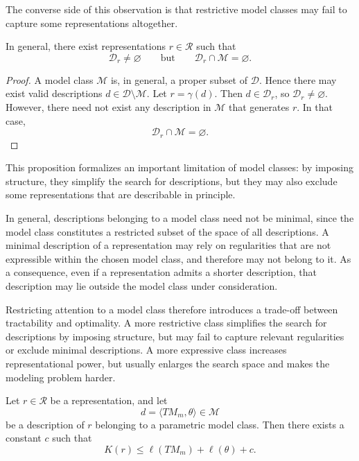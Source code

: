 The converse side of this observation is that restrictive model classes may fail to capture some representations altogether.

\begin{proposition}
\label{prop:model_class_not_universal}
In general, there exist representations \(r \in \mathcal{R}\) such that
\[
\mathcal{D}_r \neq \varnothing
\qquad\text{but}\qquad
\mathcal{D}_r \cap \mathcal{M} = \varnothing.
\]
\end{proposition}

\begin{proof}
A model class \(\mathcal{M}\) is, in general, a proper subset of \(\mathcal{D}\). Hence there may exist valid descriptions \(d \in \mathcal{D} \setminus \mathcal{M}\). Let \(r = \gamma(d)\). Then \(d \in \mathcal{D}_r\), so \(\mathcal{D}_r \neq \varnothing\). However, there need not exist any description in \(\mathcal{M}\) that generates \(r\). In that case,
\[
\mathcal{D}_r \cap \mathcal{M} = \varnothing.
\]
\end{proof}

This proposition formalizes an important limitation of model classes: by imposing structure, they simplify the search for descriptions, but they may also exclude some representations that are describable in principle.

In general, descriptions belonging to a model class need not be minimal, since the model class constitutes a restricted subset of the space of all descriptions. A minimal description of a representation may rely on regularities that are not expressible within the chosen model class, and therefore may not belong to it. As a consequence, even if a representation admits a shorter description, that description may lie outside the model class under consideration.

Restricting attention to a model class therefore introduces a trade-off between tractability and optimality. A more restrictive class simplifies the search for descriptions by imposing structure, but may fail to capture relevant regularities or exclude minimal descriptions. A more expressive class increases representational power, but usually enlarges the search space and makes the modeling problem harder.

\begin{proposition}
\label{prop:model_not_minimal}
Let \(r \in \mathcal{R}\) be a representation, and let
\[
d = \langle TM_m, \theta \rangle \in \mathcal{M}
\]
be a description of \(r\) belonging to a parametric model class. Then there exists a constant \(c\) such that
\[
K(r) \leq \ell(TM_m) + \ell(\theta) + c.
\]
\end{proposition}

